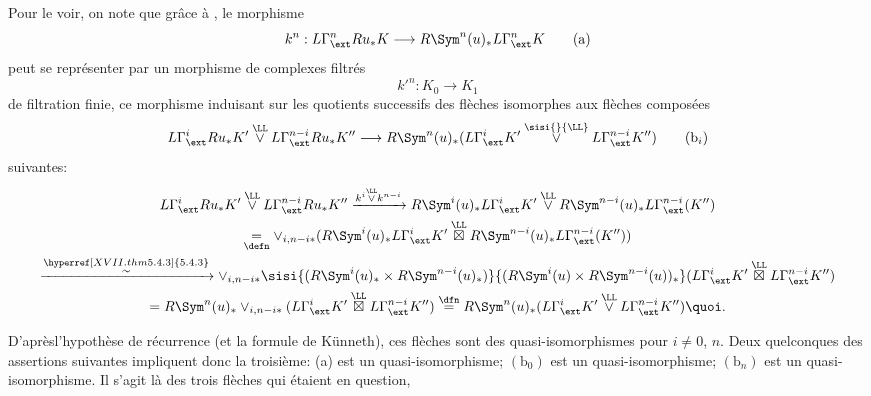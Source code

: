 \documentclass[10pt]{../fichiers-configuration-latex/smfart}
\begin{document}
Pour le voir, on note que grâce à , le morphisme
\begin{equation*}
k^{n}:L\Gamma^{n}_{\ext}Ru_{\ast}K\longrightarrow R\Sym^{n}(u)_{\ast}L\Gamma^{n}_{\ext}K\tag{a}
\end{equation*}
peut se représenter par un morphisme de complexes filtrés
$$
{k'}^{n}:K_{0}\longrightarrow K_{1}
$$
de filtration finie, ce morphisme induisant sur les quotients
successifs des flèches isomorphes aux flèches composées
\begin{equation*}
L\Gamma^{i}_{\ext}Ru_{\ast}K'\overset{\LL}{\vee}
L\Gamma^{n-i}_{\ext} Ru_{\ast}K''\longrightarrow
R\Sym^{n}(u)_{\ast}(L\Gamma^{i}_{\ext}K'\overset{\sisi{}{\LL}}{\vee}
L\Gamma^{n-i}_{\ext}K'')\tag{$\text{b}_i$}
\end{equation*}
suivantes:
\begin{gather*}
L\Gamma^{i}_{\ext}Ru_{\ast}K'\overset{\LL}{\vee}
L\Gamma^{n-i}_{\ext}Ru_{\ast}K''\xrightarrow{k^{i}\overset{\LL}{\vee}k^{n-i}}
R\Sym^{i}(u)_{\ast}L\Gamma^{i}_{\ext}K'\overset{\LL}{\vee}
R\Sym^{n-i}(u)_{\ast}L\Gamma^{n-i}_{\ext}(K'')\\
\underset{\defn}{=}
\vee_{i,n-i {\ast}}(R\Sym^{i}(u)_{\ast}L\Gamma^{i}_{\ext}K'\overset{\LL}{\boxtimes}
R\Sym^{n-i}(u)_{\ast}L\Gamma^{n-i}_{\ext}(K''))\\
\xrightarrow{\substack{\hyperref[XVII.thm5.4.3]{5.4.3}\\\sim}}\vee_{i,n-i {\ast}}\sisi{(R\Sym^{i}(u)_{\ast}\times R \Sym^{n-i}(u)_{\ast})}{(R\Sym^i(u)\times R\Sym^{n-i}(u))_\ast}
(L\Gamma^{i}_{\ext}K'\overset{\LL}{\boxtimes}
L\Gamma^{n-i}_{\ext}K'')\\
=R\Sym^{n}(u)_{\ast}\vee_{i,n-i{\ast}}(L\Gamma^{i}_{\ext}K'\overset{\LL}{\boxtimes}L\Gamma^{n-i}_{\ext}K'')\overset{\dfn}{=} R\Sym^{n}(u)_{\ast}(L\Gamma^{i}_{\ext}K'\overset{\LL}{\vee}L\Gamma^{n-i}_{\ext}K''){\quoi}.
\end{gather*}

D'après\pageoriginale l'hypothèse de récurrence (et la formule de
Künneth), ces flèches sont des quasi-isomorphismes pour $i\neq 0$,
$n$. Deux quelconques des assertions suivantes impliquent donc la
troisième: (a) est un quasi-isomorphisme; $(\text{b}_0)$ est un
quasi-isomorphisme; $(\text{b}_n)$ est un quasi-isomorphisme. Il s'agit
là des trois flèches qui étaient en question, \cqfd

\setcounter{subsubsection}{22}
\setcounter{paragraph}{2}
\end{document}
